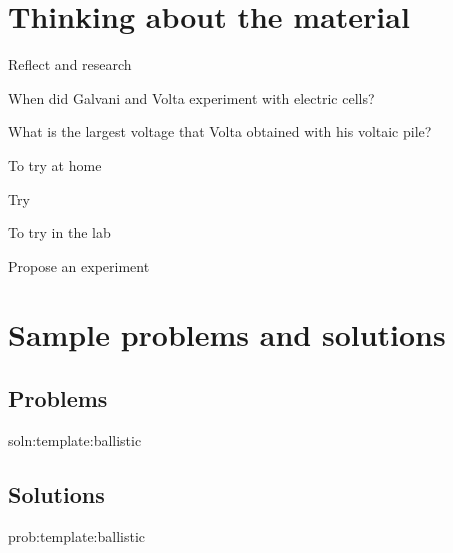 \newpage
\section{Thinking about the material}

\begin{chapteractivity}{Reflect and research}
{
\item When did Galvani and Volta experiment with electric cells?
\item What is the largest voltage that Volta obtained with his voltaic pile?
}
\end{chapteractivity}

\begin{chapteractivity}{To try at home}
{
\item Try
}
\end{chapteractivity}

\begin{chapteractivity}{To try in the lab}
{
\item Propose an experiment
}
\end{chapteractivity}

\newpage
\section{Sample problems and solutions}
\subsection{Problems}
\begin{problem}{soln:template:ballistic}{\label{prob:template:ballistic} 

}
\end{problem}

\newpage
\subsection{Solutions}
\begin{solution}{prob:template:ballistic}\label{soln:template:ballistic}

\end{solution}

